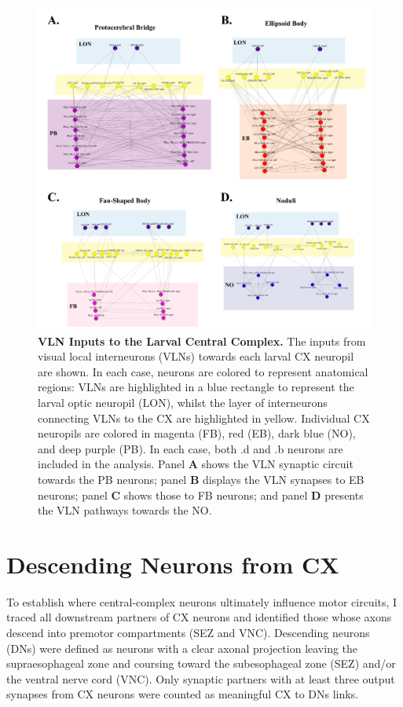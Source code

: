     \begin{figure}[H]
        \centering
        \includegraphics[width=15cm]{Figs/CX/VLNstoCX.pdf}
        \caption[Visual Inputs via VLNs to larval Central Complex Neuropils]{\textbf{VLN Inputs to the Larval Central Complex.} The inputs from visual local interneurons (VLNs) towards each larval CX neuropil are shown. In each case, neurons are colored to represent anatomical regions: VLNs are highlighted in a blue rectangle to represent the larval optic neuropil (LON), whilst the layer of interneurons connecting VLNs to the CX are highlighted in yellow. Individual CX neuropils are colored in magenta (FB), red (EB), dark blue (NO), and deep purple (PB). In each case, both .d and .b neurons are included in the analysis. Panel \textbf{A} shows the VLN synaptic circuit towards the PB neurons; panel \textbf{B} displays the VLN synapses to EB neurons; panel \textbf{C} shows those to FB neurons; and panel \textbf{D} presents the VLN pathways towards the NO.}
        \label{VLNs}
    \end{figure}

 \section{Descending Neurons from CX}    
    To establish where central-complex neurons ultimately influence motor circuits, I traced all downstream partners of CX neurons and identified those whose axons descend into premotor compartments (SEZ and VNC). Descending neurons (DNs) were defined as neurons with a clear axonal projection leaving the supraesophageal zone and coursing toward the subesophageal zone (SEZ) and/or the ventral nerve cord (VNC). Only synaptic partners with at least three output synapses from CX neurons were counted as meaningful CX to DNs links. 

